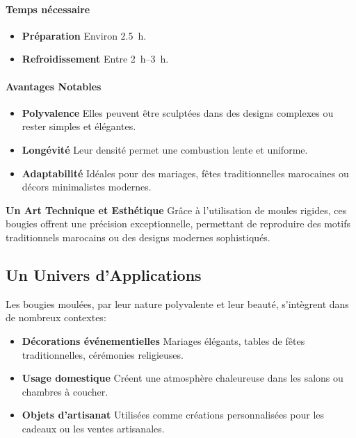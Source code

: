 \documentclass[11pt,fleqn,onecolumn,oneside]{book}
\begin{document}
\paragraph{Temps nécessaire}
\begin{itemize}
    \item \textbf{Préparation} Environ \SI{2.5}{\hour}.
    \item \textbf{Refroidissement} Entre \SIrange{2}{3}{\hour}.
\end{itemize}

\paragraph{Avantages Notables}
\begin{itemize}
    \item \textbf{Polyvalence} Elles peuvent être sculptées dans des designs complexes ou rester simples et élégantes.
    \item \textbf{Longévité} Leur densité permet une combustion lente et uniforme.
    \item \textbf{Adaptabilité} Idéales pour des mariages, fêtes traditionnelles marocaines ou décors minimalistes modernes.
\end{itemize}

\begin{remark}
\textbf{Un Art Technique et Esthétique} Grâce à l’utilisation de moules rigides, ces bougies offrent une précision exceptionnelle, permettant de reproduire des motifs traditionnels marocains ou des designs modernes sophistiqués.
\end{remark}

\subsection*{Un Univers d’Applications}

Les bougies moulées, par leur nature polyvalente et leur beauté, s’intègrent dans de nombreux contextes:
\begin{itemize}
    \item \textbf{Décorations événementielles} Mariages élégants, tables de fêtes traditionnelles, cérémonies religieuses.
    \item \textbf{Usage domestique} Créent une atmosphère chaleureuse dans les salons ou chambres à coucher.
    \item \textbf{Objets d'artisanat} Utilisées comme créations personnalisées pour les cadeaux ou les ventes artisanales.
\end{itemize}
\end{document}
